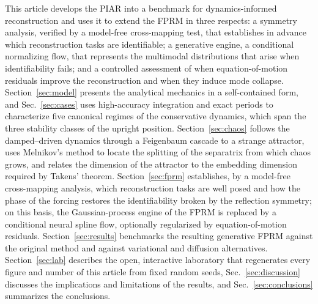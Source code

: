 This article develops the PIAR into a benchmark for dynamics-informed reconstruction and uses it to extend the FPRM in three respects: a symmetry analysis, verified by a model-free cross-mapping test, that establishes in advance which reconstruction tasks are identifiable; a generative engine, a conditional normalizing flow, that represents the multimodal distributions that arise when identifiability fails; and a controlled assessment of when equation-of-motion residuals improve the reconstruction and when they induce mode collapse. Section~\ref{sec:model} presents the analytical mechanics in a self-contained form, and Sec.~\ref{sec:cases} uses high-accuracy integration and exact periods to characterize five canonical regimes of the conservative dynamics, which span the three stability classes of the upright position. Section~\ref{sec:chaos} follows the damped--driven dynamics through a Feigenbaum cascade to a strange attractor, uses Melnikov's method to locate the splitting of the separatrix from which chaos grows, and relates the dimension of the attractor to the embedding dimension required by Takens' theorem. Section~\ref{sec:fprm} establishes, by a model-free cross-mapping analysis, which reconstruction tasks are well posed and how the phase of the forcing restores the identifiability broken by the reflection symmetry; on this basis, the Gaussian-process engine of the FPRM is replaced by a conditional neural spline flow, optionally regularized by equation-of-motion residuals. Section~\ref{sec:results} benchmarks the resulting generative FPRM against the original method and against variational and diffusion alternatives. Section~\ref{sec:lab} describes the open, interactive laboratory that regenerates every figure and number of this article from fixed random seeds, Sec.~\ref{sec:discussion} discusses the implications and limitations of the results, and Sec.~\ref{sec:conclusions} summarizes the conclusions.
